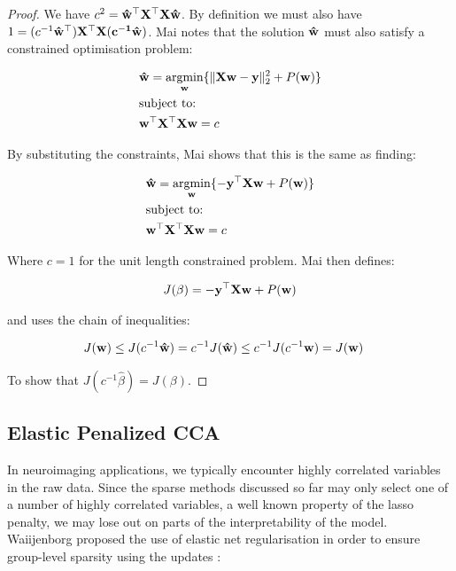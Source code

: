 \begin{proof}

We have $c^2=\bold{\hat{w}^{\top}X^{\top}X\hat{w}}$. By definition we must also have $1=(c^{-1}\bold{\hat{w}^{\top})X^{\top}X(c^{-1}\hat{w})}$. Mai notes that the solution $\bold{\hat{w}}$ must also satisfy a constrained optimisation problem:

\begin{align}
    & \bold{\hat{w}}= \underset{\bold{w}}{\mathrm{argmin}}\{ \|\bold{Xw-y}\|^2_2 + P(\bold{w}) \}\\
    & \text{subject to:} \notag\\
    & \bold{w^{\top}X^{\top}Xw}=c \notag
\end{align}

By substituting the constraints, Mai shows that this is the same as finding:

\begin{align}
    & \bold{\hat{w}}=\underset{\bold{w}}{\mathrm{argmin}}\{ -\bold{y^{\top}Xw} + P(\bold{w)} \}\\
    & \text{subject to:} \notag\\
    & \bold{w^{\top}X^{\top}Xw}=c \notag
\end{align}

Where $c=1$ for the unit length constrained problem. Mai then defines:

\begin{align}
    & J(\beta)=-\bold{y^{\top}Xw} + P(\bold{w})\\
\end{align}

and uses the chain of inequalities:

\begin{align}\label{eq:maiinequalitychain}
    & J(\bold{w}) \leq J(c^{-1}\bold{\hat{w}})=c^{-1}J(\bold{\hat{w}}) \leq c^{-1}J(c^{-1}\bold{w}) = J(\bold{w})
\end{align}

To show that $J(c^{-1}\hat{\beta})=J(\beta)$. 

\end{proof}

\subsection{Elastic Penalized CCA}

In neuroimaging applications, we typically encounter highly correlated variables in the raw data. Since the sparse methods discussed so far may only select one of a number of highly correlated variables, a well known property of the lasso penalty, we may lose out on parts of the interpretability of the model. Waiijenborg proposed the use of elastic net regularisation in order to ensure group-level sparsity using the updates \cite{waaijenborg2008quantifying}:

